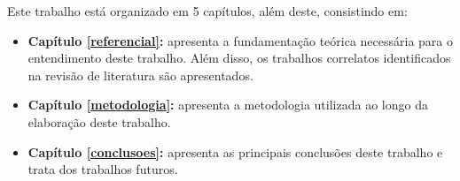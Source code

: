 Este trabalho está organizado em 5 capítulos, além deste, consistindo em:
\begin{itemize}

\item \textbf{Capítulo \ref{referencial}:} apresenta a fundamentação teórica necessária para o entendimento deste trabalho. Além disso, os trabalhos correlatos identificados na revisão de literatura são apresentados.

\item \textbf{Capítulo \ref{metodologia}:} apresenta a metodologia utilizada ao longo da elaboração deste trabalho.


\item \textbf{Capítulo \ref{conclusoes}:} apresenta as principais conclusões deste trabalho e trata dos trabalhos futuros.
\end{itemize}





